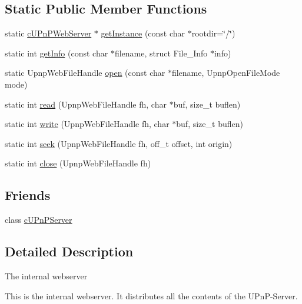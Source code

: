 \subsection*{Static Public Member Functions}
\begin{CompactItemize}
\item 
static \hyperlink{classcUPnPWebServer}{cUPnPWebServer} $\ast$ \hyperlink{classcUPnPWebServer_59fb8d378eae0193665b51fdda5a4da0}{getInstance} (const char $\ast$rootdir=\char`\"{}/\char`\"{})
\item 
static int \hyperlink{classcUPnPWebServer_0540de6d9f111756593d202f30102ffb}{getInfo} (const char $\ast$filename, struct File\_\-Info $\ast$info)
\item 
static UpnpWebFileHandle \hyperlink{classcUPnPWebServer_5f9d44729464cab3e8bf74e4457dbb24}{open} (const char $\ast$filename, UpnpOpenFileMode mode)
\item 
static int \hyperlink{classcUPnPWebServer_7bdaa921f11a40da60c5fc99f577a017}{read} (UpnpWebFileHandle fh, char $\ast$buf, size\_\-t buflen)
\item 
static int \hyperlink{classcUPnPWebServer_46e282288394c8ba37e9d4846944c6a4}{write} (UpnpWebFileHandle fh, char $\ast$buf, size\_\-t buflen)
\item 
static int \hyperlink{classcUPnPWebServer_2d1ee3a89ea42cb9fd0669937061695f}{seek} (UpnpWebFileHandle fh, off\_\-t offset, int origin)
\item 
static int \hyperlink{classcUPnPWebServer_79d080eaf445325b7f8759dfb0744c26}{close} (UpnpWebFileHandle fh)
\end{CompactItemize}
\subsection*{Friends}
\begin{CompactItemize}
\item 
\hypertarget{classcUPnPWebServer_02ebb94fd2cdff4bfb2da3267446d62b}{
class \hyperlink{classcUPnPWebServer_02ebb94fd2cdff4bfb2da3267446d62b}{cUPnPServer}}
\label{classcUPnPWebServer_02ebb94fd2cdff4bfb2da3267446d62b}

\end{CompactItemize}


\subsection{Detailed Description}
The internal webserver

This is the internal webserver. It distributes all the contents of the UPnP-Server. 

